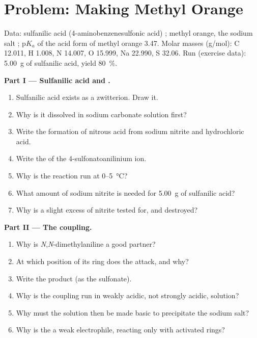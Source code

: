 \section{Problem: Making Methyl Orange}

\begin{problem}
\label{pb:b2:amines:1}
Data: sulfanilic acid (4-aminobenzenesulfonic acid) ; methyl orange, the sodium salt
; $\mathrm pK_a$ of the acid form of methyl orange 3.47. Molar masses
(\unit{g/mol}): C 12.011, H 1.008, N 14.007, O 15.999, Na 22.990, S 32.06. Run (exercise data):
\qty{5.00}{g} of sulfanilic acid, yield 80~\%.

\medskip
\noindent\textbf{Part I --- Sulfanilic acid and .}
\begin{enumerate}
  \item Sulfanilic acid exists as a zwitterion. Draw it.
  \item Why is it dissolved in sodium carbonate solution first?
  \item Write the formation of nitrous acid from sodium nitrite and hydrochloric acid.
  \item Write the  of the 4-sulfonatoanilinium ion.
  \item Why is the reaction run at 0--\qty{5}{\degreeCelsius}?
  \item What amount of sodium nitrite is needed for \qty{5.00}{g} of sulfanilic acid?
  \item Why is a slight excess of nitrite tested for, and destroyed?
\end{enumerate}

\medskip
\noindent\textbf{Part II --- The coupling.}
\begin{enumerate}[resume]
  \item Why is \textit{N},\textit{N}-dimethylaniline a good partner?
  \item At which position of its ring does the  attack, and why?
  \item Write the product (as the sulfonate).
  \item Why is the coupling run in weakly acidic, not strongly acidic, solution?
  \item Why must the solution then be made basic to precipitate the sodium salt?
  \item Why is the  a weak electrophile, reacting only with activated rings?
\end{enumerate}


\end{problem}
